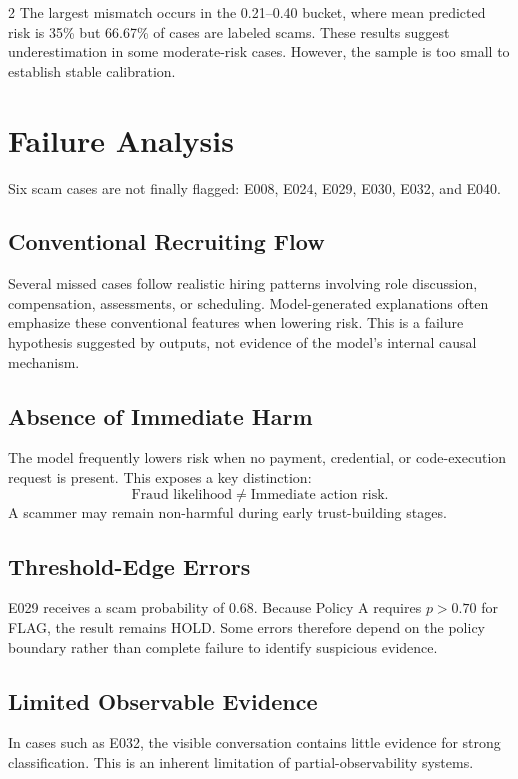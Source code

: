 \documentclass{article}
\begin{document}
\begin{multicols}{2}
The largest mismatch occurs in the 0.21--0.40 bucket, where mean predicted risk is 35\% but 66.67\% of cases are labeled scams. These results suggest underestimation in some moderate-risk cases. However, the sample is too small to establish stable calibration.

\section{Failure Analysis}

Six scam cases are not finally flagged: E008, E024, E029, E030, E032, and E040.

\subsection{Conventional Recruiting Flow}

Several missed cases follow realistic hiring patterns involving role discussion, compensation, assessments, or scheduling. Model-generated explanations often emphasize these conventional features when lowering risk. This is a failure hypothesis suggested by outputs, not evidence of the model's internal causal mechanism.

\subsection{Absence of Immediate Harm}

The model frequently lowers risk when no payment, credential, or code-execution request is present. This exposes a key distinction:
\[
\text{Fraud likelihood} \neq \text{Immediate action risk}.
\]
A scammer may remain non-harmful during early trust-building stages.

\subsection{Threshold-Edge Errors}

E029 receives a scam probability of 0.68. Because Policy A requires $p>0.70$ for FLAG, the result remains HOLD. Some errors therefore depend on the policy boundary rather than complete failure to identify suspicious evidence.

\subsection{Limited Observable Evidence}

In cases such as E032, the visible conversation contains little evidence for strong classification. This is an inherent limitation of partial-observability systems.


\end{multicols}
\end{document}
